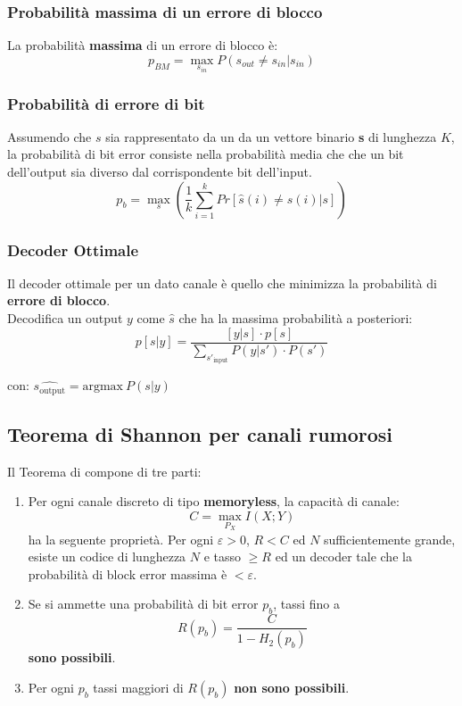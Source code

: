 \subsubsection{Probabilità massima di un errore di blocco}
La probabilità \textbf{massima} di un errore di blocco è:
\begin{equation}
	p_{BM} = \max_{s_{in}} P(s_{out} \neq s_{in}|s_{in})
\end{equation}

\subsubsection{Probabilità di errore di bit}
Assumendo che $s$ sia rappresentato da un da un vettore binario \textbf{s} di lunghezza $K$, la probabilità di bit error consiste nella probabilità media che che un bit dell’output sia
diverso dal corrispondente bit dell’input.
\begin{equation}
	p_b = \max_{s} \left(\frac{1}{k} \sum_{i=1}^{k} Pr[\hat{s}(i) \neq s(i)|s]\right)
\end{equation}

\subsubsection{Decoder Ottimale}
Il decoder ottimale per un dato canale è quello che minimizza la probabilità di \textbf{errore di blocco}.\\ 
Decodifica un output $y$ come $\hat{s}$ che ha la massima probabilità a posteriori:
\begin{equation}
	p[s|y] = \frac{[y|s]\cdot p[s]}{\sum_{s'_{\text{input}}} P(y|s')\cdot P(s')}
\end{equation}

con: $\hat{s_{\text{output}}} = \text{argmax}\ P(s|y)$
\newpage
\subsection{Teorema di Shannon per canali rumorosi}
Il Teorema di compone di tre parti:
\begin{enumerate}
	\item Per ogni canale discreto di tipo \textbf{memoryless}, la capacità di canale:
	\begin{equation}
		C = \max_{P_X} I(X;Y)
	\end{equation}
	ha la seguente proprietà. Per ogni $\varepsilon > 0$, $R < C$ ed $N$ sufficientemente grande, esiste un codice di lunghezza $N$ e tasso $\geq R$ ed un decoder tale che la probabilità di block error massima è $< \varepsilon$.
	
	\item Se si ammette una probabilità di bit error $p_b$, tassi fino a
	\begin{equation}
		R(p_b) = \frac{C}{1 - H_2(p_b)}
	\end{equation}
	\textbf{sono possibili}.
	
	\item Per ogni $p_b$ tassi maggiori di $R(p_b)$ \textbf{non sono possibili}.
\end{enumerate}

